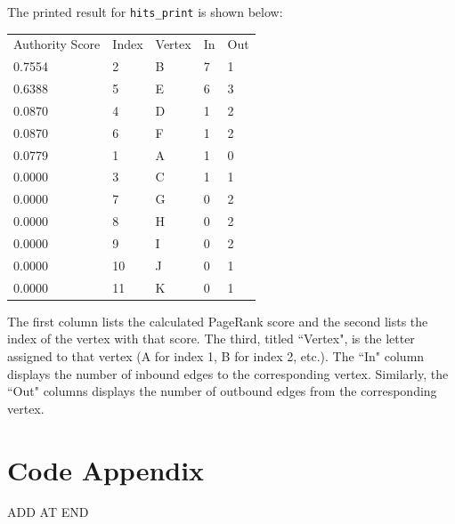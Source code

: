 \documentclass[12pt, titlepage, twoside]{amsart}
\begin{document}
The printed result for \texttt{hits_print} is shown below:

\begin{table}[h]
\begin{tabular}{lllll}
Authority Score & Index & Vertex & In & Out\\
    0.7554 &         2 &         B& 7 &         1 \\
    0.6388 &         5 &         E & 6 &         3 \\
    0.0870 &         4 &         D & 1 &         2 \\
    0.0870 &         6 &         F & 1 &         2 \\
    0.0779 &         1 &         A & 1 &         0 \\
    0.0000 &         3 &         C & 1 &         1 \\
    0.0000 &         7 &         G & 0 &         2 \\
    0.0000 &         8 &         H & 0 &         2 \\
    0.0000 &         9 &         I & 0 &         2 \\
    0.0000 &        10 &        J & 0 &         1 \\
    0.0000 &        11 &        K & 0 &         1 \\
\end{tabular}
\end{table}

The first column lists the calculated PageRank score and
the second lists the index of the vertex with that score.
The third, titled ``Vertex", is the letter assigned to that vertex (A for index 1, B for index 2, etc.).
The ``In" column displays the number of inbound edges to the corresponding vertex.
Similarly, the ``Out" columns displays the number of outbound edges from the corresponding vertex.




\section{Code Appendix}

ADD AT END
\end{document}
